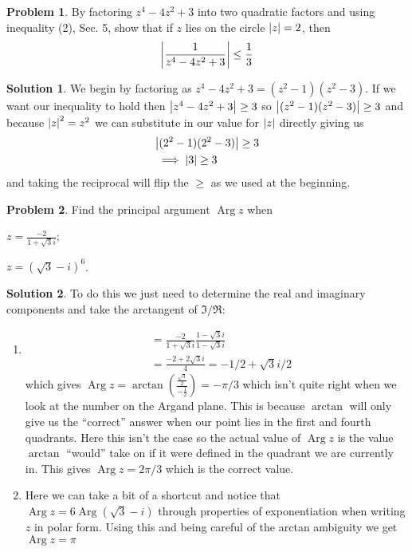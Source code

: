 \documentclass[10pt]{article}
\theoremstyle{definition}
\newtheorem{problem}{Problem}
\newtheorem{soln}{Solution}
\DeclareMathOperator\Arg{Arg}
\begin{document}
\begin{problem}
By factoring $z^4 - 4z^2 + 3$ into two quadratic factors and using inequality (2), Sec. 5,
show that if $z$ lies on the circle $\abs{z} = 2$, then
$$\abs{\frac{1}{z^4-4z^2+3}}\leq \frac{1}{3}$$
\end{problem}
\begin{soln}
  We begin by factoring as $z^4 - 4z^2 + 3=(z^2-1)(z^2-3)$. If we want our inequality to hold then $\abs{z^4-4z^2+3} \geq 3$
  so $\abs{(z^2-1)(z^2-3)}\geq 3$ and because $\abs{z}^2=z^2$ we can substitute in our value for $\abs{z}$ directly giving us
  \begin{align*}
     & \abs{(2^2-1)(2^2-3)}\geq 3 \\
     & \implies \abs{3}\geq 3
  \end{align*}
  and taking the reciprocal will flip the $\geq$ as we used at the beginning.
\end{soln}
\newpage

\begin{problem}
Find the principal argument $\Arg{z}$ when\\
\begin{center}
  \begin{enumerate*}[label=(\alph*)]
    \item $\displaystyle z=\frac{-2}{1+\sqrt{3}i}$;\qquad~
    \item $\displaystyle z=\left(\sqrt{3}-i\right)^6$.
  \end{enumerate*}
\end{center}
\end{problem}
\begin{soln}
  To do this we just need to determine the real and imaginary components and take the arctangent of $\Im/\Re$:
  \begin{enumerate}[label=(\alph*)]
    \item \begin{align*}
             & =\frac{-2}{1+\sqrt{3}i}\frac{1-\sqrt{3}i}{1-\sqrt{3}i} \\
             & =\frac{-2+2\sqrt{3}i}{4}=-1/2+\sqrt{3}i/2
          \end{align*}
          which gives $\Arg z=\arctan\left(\displaystyle\frac{\frac{\sqrt{3}}{2}}{-\frac{1}{2}}\right)=-\pi/3$ which isn't quite right when we look at the
          number on the Argand plane. This is because $\arctan$ will only give us the ``correct'' answer when our point lies in the first and fourth quadrants.
          Here this isn't the case so the actual value of $\Arg z$ is the value $\arctan$ ``would'' take on if it were defined in the quadrant we
          are currently in. This gives $\Arg z=2\pi/3$ which is the correct value.
    \item Here we can take a bit of a shortcut and notice that $\Arg z = 6 \Arg \left(\sqrt{3}-i\right)$ through properties of exponentiation when
          writing $z$ in polar form. Using this and being careful of the arctan ambiguity we get $\Arg z = \pi$
  \end{enumerate}
\end{soln}
\end{document}
